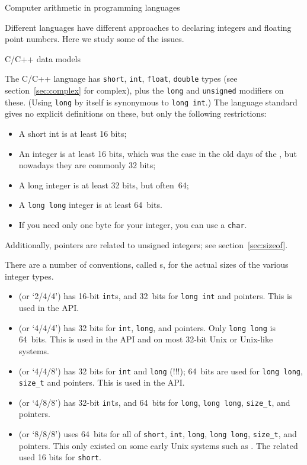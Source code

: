  {Computer arithmetic in programming languages}

Different languages have different approaches to declaring integers and
floating point numbers. Here we study some of the issues.

 {C/C++ data models}
\label{sec:data-model}

The C/C++ language has \lstinline{short}, \lstinline{int}, \lstinline{float},
\lstinline{double} types
(see section~\ref{sec:complex} for complex),
plus the \lstinline{long} and \lstinline{unsigned} modifiers on these.
(Using \lstinline{long} by itself is synonymous to \lstinline{long int}.)
%
The language standard gives no explicit definitions on these,
but only the following restrictions:
\begin{itemize}
\item A short int is at least 16 bits;
\item An integer is at least 16 bits, which was the case
  in the old days of the ,
  but nowadays they are commonly 32 bits;
\item A long integer is at least 32 bits, but often~64;
\item A \lstinline{long long} integer is at least 64~bits.
\item If you need only one byte for your integer, you can use a \lstinline{char}.
\end{itemize}
Additionally, pointers are related to unsigned integers;
see section~\ref{sec:sizeof}.


There are a number of conventions, called s,
for the actual sizes of the various integer types.
\begin{itemize}
\item {} (or `2/4/4') has 16-bit \lstinline{int}s,
  and 32~bits for \lstinline{long int} and pointers.
  This is used in the  \acs{API}.
\item {} (or `4/4/4')
  has 32 bits for \lstinline{int}, \lstinline{long}, and pointers.
  Only \lstinline{long long} is 64~bits.
  This is used in the  \acs{API}
  and on most 32-bit Unix or Unix-like systems.
\item {} (or `4/4/8')
  has 32 bits for \lstinline{int} and \lstinline{long} (!!!);
   64~bits are used for \lstinline{long long}, \lstinline{size_t} and pointers.
  This is used in the  API.
\item {} (or `4/8/8')
  has 32-bit \lstinline{int}s, and 64~bits for \lstinline{long},
  \lstinline{long long}, \lstinline{size_t}, and pointers.
\item {} (or `8/8/8') uses 64~bits for all of \lstinline{short},
  \lstinline{int}, \lstinline{long}, \lstinline{long long}, \lstinline{size_t},
  and pointers.
  This only existed on some early Unix systems such as
  .
  The related  used 16 bits for \lstinline{short}.
\end{itemize}

